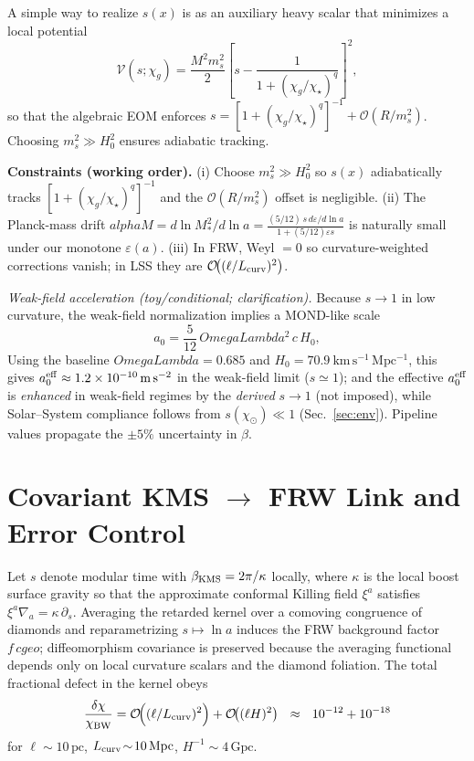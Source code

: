 \documentclass[aps,prd,onecolumn,superscriptaddress,nofootinbib]{revtex4-2}
\def\OmL{OmegaLambda}%
\def\cgeo{cgeo}%
\def\alpha{alpha}%
\def\alpha_M{alphaM}%
\def\Omega_\Lambda{OmegaLambda}%
\providecommand{\OmL}{\Omega_\Lambda}
\providecommand{\cgeo}{c_{\rm geo}}
\providecommand{\be}{\begin{equation}}
\providecommand{\ee}{\end{equation}}
\begin{document}
A simple way to realize \(s(x)\) is as an auxiliary heavy scalar that minimizes a local potential
\[
\mathcal V(s;\chi_g)=\frac{M^2 m_s^2}{2}\left[s-\frac{1}{1+(\chi_g/\chi_\star)^q}\right]^2,
\]
so that the algebraic EOM enforces \(s=[1+(\chi_g/\chi_\star)^q]^{-1}+\mathcal O(R/m_s^2)\). Choosing \(m_s^2\!\gg\!H_0^2\) ensures adiabatic tracking.

\noindent\textbf{Constraints (working order).}
(i) Choose \(m_s^2\gg H_0^2\) so \(s(x)\) adiabatically tracks \([1+(\chi_g/\chi_\star)^q]^{-1}\) and the \(\mathcal O(R/m_s^2)\) offset is negligible.
(ii) The Planck-mass drift \(\alpha_M=d\ln M_*^2/d\ln a=\frac{(5/12)\,s\,d\varepsilon/d\ln a}{1+(5/12)\varepsilon s}\) is naturally small under our monotone \(\varepsilon(a)\).
(iii) In FRW, Weyl \(=0\) so curvature-weighted corrections vanish; in LSS they are \(\mathcal O\!\big((\ell/L_{\rm curv})^2\big)\).

\noindent \emph{Weak-field acceleration (toy/conditional; clarification).} Because \(s\!\to\!1\) in low curvature, the weak-field normalization implies a MOND-like scale
\be
a_0=\frac{5}{12}\,\OmL^2\,c\,H_0,
\ee
Using the baseline \(\OmL=0.685\) and \(H_0=70.9~\mathrm{km\,s^{-1}\,Mpc^{-1}}\), this gives \(a_0^{\rm eff}\approx 1.2\times 10^{-10}\,\mathrm{m\,s^{-2}}\) in the weak-field limit (\(s\simeq 1\));
and the effective \(a_0^{\rm eff}\) is \emph{enhanced} in weak-field regimes by the \emph{derived} \(s\!\to\!1\) (not imposed), while Solar–System compliance follows from \(s(\chi_\odot)\ll 1\) (Sec.~\ref{sec:env}). Pipeline values propagate the \(\pm 5\%\) uncertainty in \(\beta\).

\section{Covariant KMS \texorpdfstring{$\to$}{->} FRW Link and Error Control}
\label{sec:kms-frw}
Let \(s\) denote modular time with \(\beta_{\rm KMS}=2\pi/\kappa\) locally, where \(\kappa\) is the local boost surface gravity so that the approximate conformal Killing field \(\xi^a\) satisfies \(\xi^a\nabla_a=\kappa\,\partial_s\).
Averaging the retarded kernel over a comoving congruence of diamonds and reparametrizing \(s\mapsto \ln a\) induces the FRW background factor \(f\,\cgeo\); diffeomorphism covariance is preserved because the averaging functional depends only on local curvature scalars and the diamond foliation. The total fractional defect in the kernel obeys
\be
\label{eq:chi-defect}
\frac{\delta\chi}{\chi_{\rm BW}}=\mathcal O\!\Big((\ell/L_{\rm curv})^2\Big)+\mathcal O\!\big((\ell H)^2\big)
\ \ \approx\ \ 10^{-12}+10^{-18}
\ee
for \(\ell\!\sim\!10\,\mathrm{pc}\), \(L_{\rm curv}\!\sim\!10\,\mathrm{Mpc}\), \(H^{-1}\!\sim\!4\,\mathrm{Gpc}\).
\end{document}
